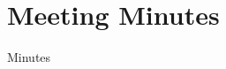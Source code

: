\documentclass[../main.tex]{subfiles}
\begin{document}
	\chapter{Meeting Minutes}
		Minutes
\end{document}
